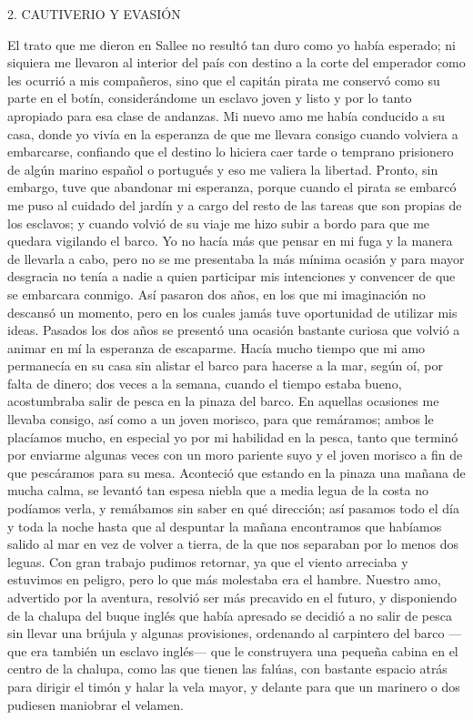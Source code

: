 \documentclass{novela}
\begin{document}
    2. CAUTIVERIO Y EVASIÓN




    El trato que me dieron en Sallee no resultó tan duro como yo había esperado; ni siquiera me llevaron al interior del país con destino a la corte del emperador como les ocurrió a mis compañeros, sino que el capitán pirata me conservó como su parte en el botín, considerándome un esclavo joven y listo y por lo tanto apropiado para esa clase de andanzas.
    Mi nuevo amo me había conducido a su casa, donde yo vivía en la esperanza de que me llevara consigo cuando volviera a embarcarse, confiando que el destino lo hiciera caer tarde o temprano prisionero de algún marino español o portugués y eso me valiera la libertad. Pronto, sin embargo, tuve que abandonar mi esperanza, porque cuando el pirata se embarcó me puso al cuidado del jardín y a cargo del resto de las tareas que son propias de los esclavos; y cuando volvió de su viaje me hizo subir a bordo para que me quedara vigilando el barco. Yo no hacía más que pensar en mi fuga y la manera de llevarla a cabo, pero no se me presentaba la más mínima ocasión y para mayor desgracia no tenía a nadie a quien participar mis intenciones y convencer de que se embarcara conmigo. Así pasaron dos años, en los que mi imaginación no descansó un momento, pero en los cuales jamás tuve oportunidad de utilizar mis ideas.
    Pasados los dos años se presentó una ocasión bastante curiosa que volvió a animar en mí la esperanza de escaparme. Hacía mucho tiempo que mi amo permanecía en su casa sin alistar el barco para hacerse a la mar, según oí, por falta de dinero; dos veces a la semana, cuando el tiempo estaba bueno, acostumbraba salir de pesca en la pinaza del barco. En aquellas ocasiones me llevaba consigo, así como a un joven morisco, para que remáramos; ambos le placíamos mucho, en especial yo por mi habilidad en la pesca, tanto que terminó por enviarme algunas veces con un moro pariente suyo y el joven morisco a fin de que pescáramos para su mesa.
    Aconteció que estando en la pinaza una mañana de mucha calma, se levantó tan espesa niebla que a media legua de la costa no podíamos verla, y remábamos sin saber en qué dirección; así pasamos todo el día y toda la noche hasta que al despuntar la mañana encontramos que habíamos salido al mar en vez de volver a tierra, de la que nos separaban por lo menos dos leguas. Con gran trabajo pudimos retornar, ya que el viento arreciaba y estuvimos en peligro, pero lo que más molestaba era el hambre.
    Nuestro amo, advertido por la aventura, resolvió ser más precavido en el futuro, y disponiendo de la chalupa del buque inglés que había apresado se decidió a no salir de pesca sin llevar una brújula y algunas provisiones, ordenando al carpintero del barco —que era también un esclavo inglés— que le construyera una pequeña cabina en el centro de la chalupa, como las que tienen las falúas, con bastante espacio atrás para dirigir el timón y halar la vela mayor, y delante para que un marinero o dos pudiesen maniobrar el velamen.
\end{document}
